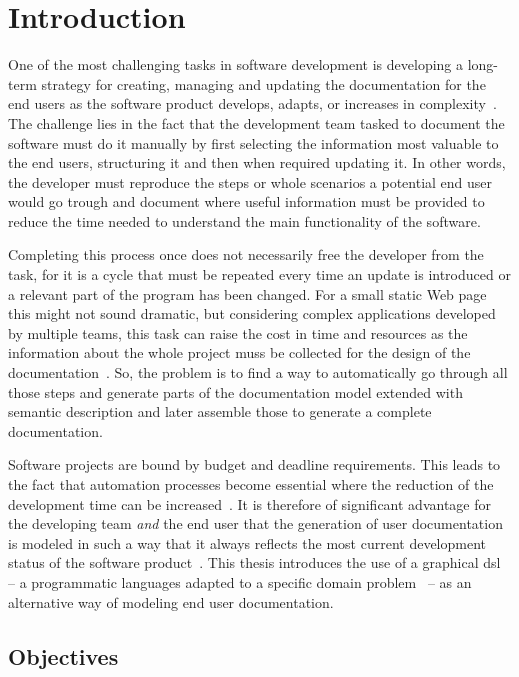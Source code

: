 \chapter{Introduction}\label{ch:intro}

One of the most challenging tasks in software development is developing a long-term strategy for creating, managing and updating the documentation for the end users as the software product develops, adapts, or increases in complexity~\cite{ieee6081814}. The challenge lies in the fact that the development team tasked to document the software must do it manually by first selecting the information most valuable to the end users, structuring it and then when required updating it. In other words, the developer must reproduce the steps or whole scenarios a potential end user would go trough and document where useful information must be provided to reduce the time needed to understand the main functionality of the software. 

Completing this process once does not necessarily free the developer from the task, for it is a cycle that must be repeated every time an update is introduced or a relevant part of the program has been changed. For a small static Web page this might not sound dramatic, but considering complex applications developed by multiple teams, this task can raise the cost in time and resources as the information about the whole project muss be collected for the design of the documentation~\cite{ieee5712775}. So, the problem is to find a way to automatically go through all those steps and generate parts of the documentation model extended with semantic description and later assemble those to generate a complete documentation.

Software projects are bound by budget and deadline requirements. This leads to the fact that automation processes become essential where the reduction of the development time can be increased~\cite{despa2014comparative}. It is therefore of significant advantage for the developing team \textit{and} the end user that the generation of user documentation is modeled in such a way that it always reflects the most current development status of the software product~\cite{waits_et_al}. This thesis introduces the use of a graphical \gls{dsl} -- a programmatic languages adapted to a specific domain problem~\cite{perez-et_al} -- as an alternative way of modeling end user documentation.

\section{Objectives}\label{sec:objectives}

